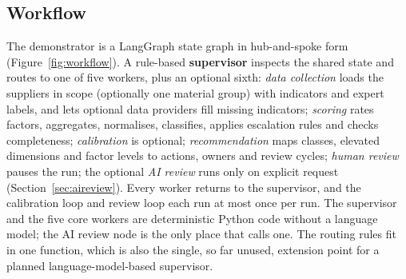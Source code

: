 \documentclass[10pt,twocolumn,a4paper]{article}
\begin{document}
\subsection{Workflow}
The demonstrator is a LangGraph state graph in hub-and-spoke form
(Figure~\ref{fig:workflow}). A rule-based \textbf{supervisor} inspects the shared state
and routes to one of five workers, plus an optional sixth: \emph{data collection} loads the suppliers in scope
(optionally one material group) with indicators and expert labels, and lets optional
data providers fill missing indicators; \emph{scoring} rates factors, aggregates,
normalises, classifies, applies escalation rules and checks completeness;
\emph{calibration} is optional; \emph{recommendation} maps classes, elevated dimensions
and factor levels to actions, owners and review cycles; \emph{human review} pauses the
run; the optional \emph{AI review} runs only on explicit request
(Section~\ref{sec:aireview}). Every worker returns to the supervisor, and the calibration
loop and review loop each run at most once per run. The supervisor and the five core
workers are deterministic Python code without a language model; the AI review node is the
only place that calls one. The routing rules fit in one function, which is also
the single, so far unused, extension point for a planned language-model-based supervisor.
\end{document}
